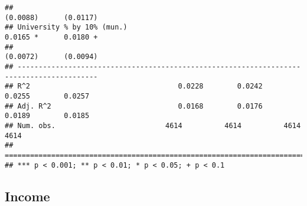 \documentclass[
]{article}
\begin{document}
\begin{verbatim}
##                                                                  (0.0088)      (0.0117)  
## University % by 10% (mun.)                                        0.0165 *      0.0180 + 
##                                                                  (0.0072)      (0.0094)  
## -----------------------------------------------------------------------------------------
## R^2                                   0.0228        0.0242        0.0255        0.0257   
## Adj. R^2                              0.0168        0.0176        0.0189        0.0185   
## Num. obs.                          4614          4614          4614          4614        
## =========================================================================================
## *** p < 0.001; ** p < 0.01; * p < 0.05; + p < 0.1
\end{verbatim}

\hypertarget{income-1}{%
\subsection{Income}\label{income-1}}
\end{document}
